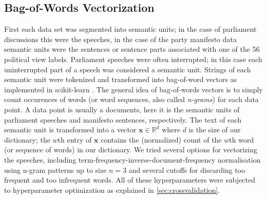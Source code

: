 \documentclass[runningheads,a4paper]{llncs}
\renewcommand{\vec}[1]{\mathbf{#1}}
\begin{document}
\subsection{Bag-of-Words Vectorization}\label{sec:bow-vectorization}
First each data set was segmented into semantic units; in the case of parliament discussions this were the speeches, in the case of the party manifesto data semantic units were the sentences or sentence parts associated with one of the 56 political view labels.  Parliament speeches were often interrupted; in this case each uninterrupted part of a speech was considered a semantic unit. Strings of each semantic unit were tokenized and transformed into bag-of-word vectors as implemented in scikit-learn \cite{scikit-learn}. The general idea of bag-of-words vectors is to simply count occurences of words (or word sequences, also called {\em n-grams}) for each data point. A data point is usually a documents, here it is the semantic units of parliament speeches and manifesto sentences, respectively. The text of each semantic unit is transformed into a vector $\vec{x}\in\mathds{R}^d$ where $d$ is the size of our dictionary; the $w$th entry of $\vec{x}$ contains the (normalized) count of the $w$th word (or sequence of words) in our dictionary. We tried several options for vectorizing the speeches, including term-frequency-inverse-document-frequency normalisation using n-gram patterns up to size $n=3$ and several cutoffs for discarding too frequent and too infrequent words. All of these hyperparameters were subjected to hyperparameter optimization as explained in \autoref{sec:crossvalidation}. 
\end{document}
